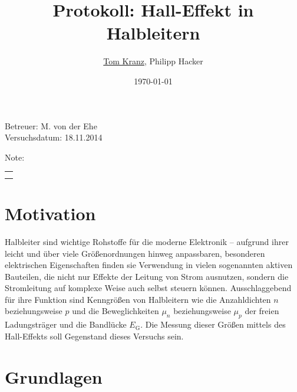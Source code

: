 \documentclass[numbers=noenddot,12pt,a4paper]{scrartcl}
\title{Protokoll: Hall-Effekt in Halbleitern}
\author{\underline{Tom Kranz}, Philipp Hacker}
\date{\today}
\newcommand{\ix}[1]{_\text{#1}}
\begin{document}
\maketitle
\begin{center}
Betreuer: M. von der Ehe\\
Versuchsdatum: 18.11.2014\\
\begin{table}[h]
\centering
Note: %
\begin{tabularx}{1.5cm}{|X|}
\hline \\ \\
\hline
\end{tabularx}
\end{table}
\end{center}
\vspace*{\fill}
\tableofcontents
\vfill
\newpage
\section{Motivation}
Halbleiter sind wichtige Rohstoffe für die moderne Elektronik -- aufgrund ihrer leicht und über viele Größenordnungen hinweg anpassbaren, besonderen elektrischen Eigenschaften finden sie Verwendung in vielen sogenannten aktiven Bauteilen, die nicht nur Effekte der Leitung von Strom ausnutzen, sondern die Stromleitung auf komplexe Weise auch selbst steuern können. Ausschlaggebend für ihre Funktion sind Kenngrößen von Halbleitern wie die Anzahldichten $n$ beziehungsweise $p$ und die Beweglichkeiten $\mu_n$ beziehungsweise $\mu_p$ der freien Ladungsträger und die Bandlücke $E\ix{G}$. Die Messung dieser Größen mittels des Hall-Effekts soll Gegenstand dieses Versuchs sein.
\section{Grundlagen}
\end{document}
